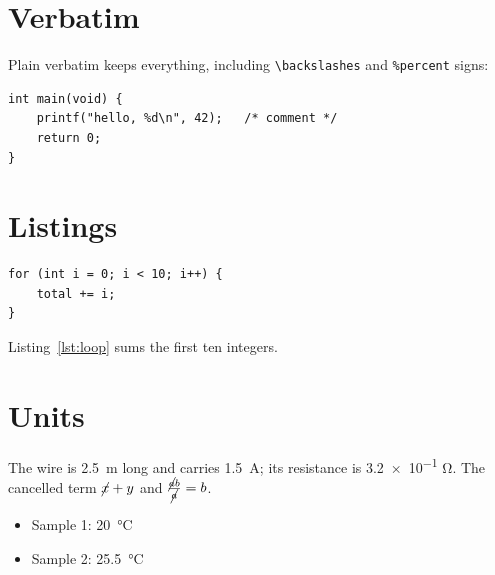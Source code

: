 \documentclass[11pt]{article}
\begin{document}
\section{Verbatim}
Plain verbatim keeps everything, including \verb|\backslashes| and \verb+%percent+ signs:
\begin{verbatim}
int main(void) {
    printf("hello, %d\n", 42);   /* comment */
    return 0;
}
\end{verbatim}

\section{Listings}
\begin{lstlisting}[caption={A loop}, label={lst:loop}]
for (int i = 0; i < 10; i++) {
    total += i;
}
\end{lstlisting}
Listing~\ref{lst:loop} sums the first ten integers.

\section{Units}
The wire is \SI{2.5}{\metre} long and carries \SI{1.5}{\ampere}; its resistance is \num{3.2e-1} \si{\ohm}. The cancelled term $\cancel{x} + y$ and $\frac{\cancel{a}b}{\cancel{a}} = b$.

\begin{itemize}
  \item Sample \num{1}: \SI{20}{\celsius}
  \item Sample \num{2}: \SI{25.5}{\degreeCelsius}
\end{itemize}
\end{document}
